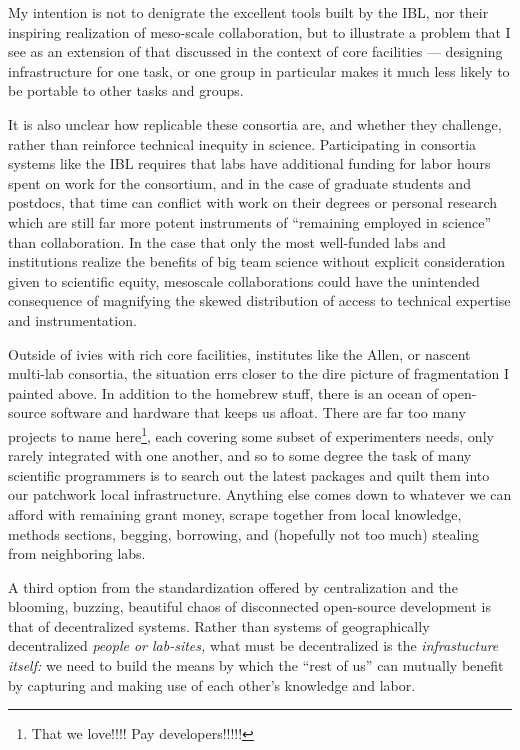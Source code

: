 \documentclass{article}
\begin{document}
My intention is not to denigrate the excellent tools built by the IBL,
nor their inspiring realization of meso-scale collaboration, but to
illustrate a problem that I see as an extension of that discussed in the
context of core facilities --- designing infrastructure for one task, or
one group in particular makes it much less likely to be portable to
other tasks and groups.

It is also unclear how replicable these consortia are, and whether they
challenge, rather than reinforce technical inequity in science.
Participating in consortia systems like the IBL requires that labs have
additional funding for labor hours spent on work for the consortium, and
in the case of graduate students and postdocs, that time can conflict
with work on their degrees or personal research which are still far more
potent instruments of ``remaining employed in science'' than
collaboration. In the case that only the most well-funded labs and
institutions realize the benefits of big team science without explicit
consideration given to scientific equity, mesoscale collaborations could
have the unintended consequence of magnifying the skewed distribution of
access to technical expertise and instrumentation.

Outside of ivies with rich core facilities, institutes like the Allen,
or nascent multi-lab consortia, the situation errs closer to the dire
picture of fragmentation I painted above. In addition to the homebrew
stuff, there is an ocean of open-source software and hardware that keeps
us afloat. There are far too many projects to name here\footnote{That we
  love!!!! Pay developers!!!!!}, each covering some subset of
experimenters needs, only rarely integrated with one another, and so to
some degree the task of many scientific programmers is to search out the
latest packages and quilt them into our patchwork local infrastructure.
Anything else comes down to whatever we can afford with remaining grant
money, scrape together from local knowledge, methods sections, begging,
borrowing, and (hopefully not too much) stealing from neighboring labs.

A third option from the standardization offered by centralization and
the blooming, buzzing, beautiful chaos of disconnected open-source
development is that of decentralized systems. Rather than systems of
geographically decentralized \emph{people or lab-sites,} what must be
decentralized is the \emph{infrastucture itself:} we need to build the
means by which the ``rest of us'' can mutually benefit by capturing and
making use of each other's knowledge and labor.
\end{document}
